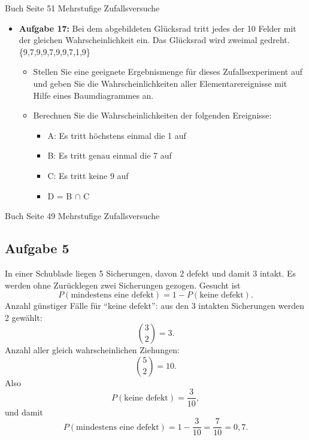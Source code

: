 \documentclass[11pt,a4paper,oneside]{article}
\begin{document}
		\begin{aufgabe}{ Buch Seite 51 Mehrstufige Zufallsversuche}
		\begin{itemize}
			\item \textbf{Aufgabe 17:} Bei dem abgebildeten Glücksrad tritt jedes der 10 Felder mit der gleichen Wahrscheinlichkeit ein. Das Glücksrad wird zweimal gedreht. \{9,7,9,9,7,9,9,7,1,9\}
			\begin{itemize}
				\item Stellen Sie eine geeignete Ergebnismenge für dieses Zufallsexperiment  auf und geben Sie die Wahrscheinlichkeiten aller Elementarereignisse mit Hilfe eines Baumdiagrammes an. 
				\item Berechnen Sie die Wahrscheinlichkeiten der folgenden Ereignisse: 
				\begin{itemize}
					\item A: Es tritt höchstens einmal die 1 auf
					\item B: Es tritt genau einmal die 7 auf 
					\item C: Es tritt keine 9 auf 
					\item D = B $\cap$ C
				\end{itemize}
			\end{itemize}
		\end{itemize}
	\end{aufgabe}
	
	\begin{loesung}{Buch Seite 49 Mehrstufige Zufallsversuche}
		
		\subsection*{Aufgabe 5}
		In einer Schublade liegen 5 Sicherungen, davon 2 defekt und damit 3 intakt. Es werden ohne Zurücklegen zwei Sicherungen gezogen. Gesucht ist
		\[
		P(\text{mindestens eine defekt}) = 1 - P(\text{keine defekt}).
		\]
		Anzahl günstiger Fälle für ``keine defekt'': aus den 3 intakten Sicherungen werden 2 gewählt:
		\[
		\binom{3}{2}=3.
		\]
		Anzahl aller gleich wahrscheinlichen Ziehungen:
		\[
		\binom{5}{2}=10.
		\]
		Also
		\[
		P(\text{keine defekt})=\frac{3}{10},
		\]
		und damit
		\[
		P(\text{mindestens eine defekt})=1-\frac{3}{10}=\frac{7}{10}=0{,}7.
		\]
	\end{loesung}
	
\end{document}
